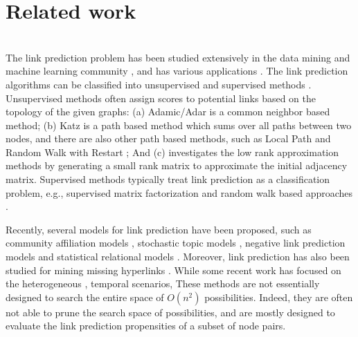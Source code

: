 \section{Related work}
\label{sec-related}

\\




The link prediction problem has been studied extensively in the data mining and machine learning community
\cite{kleinberg,linyuan-2011}, and has various applications  \cite{adom,kunegis,kleinberg,barbieri2014,back,tang2015}.
The link prediction algorithms can be classified into unsupervised and supervised methods \cite{propflow}. Unsupervised methods
often assign scores to potential links based on the topology of the given graphs:
(a) Adamic/Adar \cite{adamic} is a common neighbor based method; (b) Katz \cite{katz-1953} is a
path based method which sums over all paths between two nodes, and there are also other path based
methods, such as Local Path and Random Walk with Restart \cite{linyuan-2011}; And (c)
 investigates the low rank approximation methods by generating a
small rank matrix to approximate the initial adjacency matrix. Supervised methods
typically treat link prediction as a classification problem, e.g., supervised matrix factorization and random walk based approaches \cite{menon,back}.

Recently, several models for link prediction have been proposed,
such as  community affiliation models \cite{yang-wsdm2013}, stochastic topic models \cite{barbieri2014},
negative link prediction models \cite{tang2015} and statistical relational models \cite{bilgic,Getoor01,Getoor02}.
Moreover, link prediction has also been studied for mining
missing hyperlinks \cite{west2015}.
While some recent work has focused on the heterogeneous \cite{yang}, temporal \cite{back,dwang} scenarios, 
These methods are not essentially
designed to search the entire space of $O(n^2)$ possibilities. Indeed, they are often not able to prune the search space of possibilities, and are mostly designed to evaluate the link prediction propensities of a subset of node pairs.

